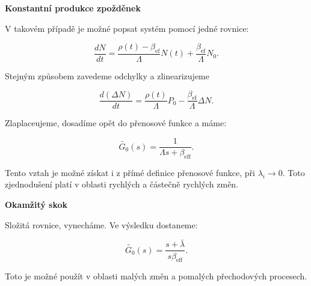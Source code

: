 \textbf{Konstantní produkce zpožděnek}

V takovém případě je možné popsat systém pomocí jedné rovnice:

$$ \dfrac{dN}{dt} = \dfrac{\rho(t) - \beta_{\text{ef}}}{\Lambda} N(t) + \dfrac{\beta_{\text{ef}}}{\Lambda} N_0. $$

Stejným způsobem zavedeme odchylky a zlinearizujeme

$$ \dfrac{d (\Delta N)}{dt} = \dfrac{\rho(t)}{\Lambda} P_0 - \dfrac{\beta_{\text{ef}}}{\Lambda} \Delta N. $$

Zlaplaceujeme, dosadíme opět do přenosové funkce a máme:

$$ \tilde{G_0} (s) = \dfrac{1}{\Lambda s +  \beta_{\text{eff}}}. $$

Tento vztah je možné získat i z přímé definice přenosové funkce, při $\lambda_i \rightarrow 0$. Toto zjednodušení platí v oblasti rychlých a částečně rychlých změn.

\textbf{Okamžitý skok}

Složitá rovnice, vynecháme. Ve výsledku dostaneme:

$$ \tilde{G_0} (s) = \dfrac{s+\bar{\lambda}}{s \beta_{\text{eff}}}. $$

Toto je možné použít v oblasti malých změn a pomalých přechodových procesech.